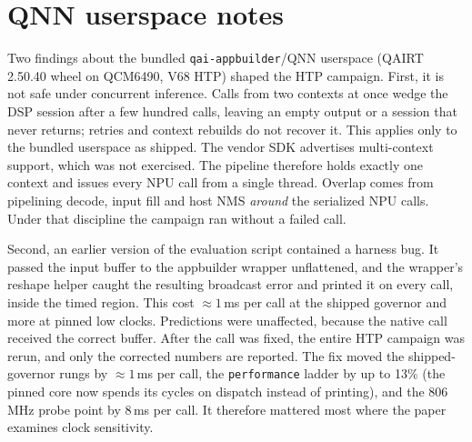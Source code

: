 \section{QNN userspace notes}
\label{app:qnn}

Two findings about the bundled \texttt{qai-appbuilder}/QNN userspace
(QAIRT 2.50.40 wheel on QCM6490, V68 HTP) shaped the HTP campaign.
First, it is not safe under concurrent inference. Calls from
two contexts at once wedge the DSP session after a few hundred calls,
leaving an empty output or a session that never returns; retries and
context rebuilds do not recover it. This applies only to the bundled
userspace as shipped. The vendor SDK advertises multi-context support,
which was not exercised. The pipeline therefore holds exactly one
context and issues every NPU call from a single thread. Overlap comes
from pipelining decode, input fill and host NMS \emph{around} the
serialized NPU calls. Under that discipline the campaign ran
without a failed call.

Second, an earlier version of the evaluation script contained a harness
bug. It passed the input buffer to the appbuilder wrapper unflattened,
and the wrapper's reshape helper caught the resulting broadcast error
and printed it on every call, inside the timed region. This cost
${\approx}1$\,ms per call at the shipped governor and more at pinned
low clocks. Predictions were unaffected, because the native call
received the correct buffer. After the call was fixed, the entire HTP
campaign was rerun, and only the corrected numbers are reported. The
fix moved the shipped-governor rungs by ${\approx}1$\,ms per call, the
\texttt{performance} ladder by up to 13\% (the pinned core now spends
its cycles on dispatch instead of printing), and the 806\,MHz probe
point by 8\,ms per call. It therefore mattered most where the paper
examines clock sensitivity.

